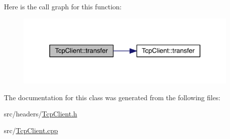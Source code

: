 Here is the call graph for this function\+:\nopagebreak
\begin{figure}[H]
\begin{center}
\leavevmode
\includegraphics[width=309pt]{class_tcp_client_ac893e0e784ed793d6d86447a8d63a193_cgraph}
\end{center}
\end{figure}




The documentation for this class was generated from the following files\+:\begin{DoxyCompactItemize}
\item 
src/headers/\hyperlink{_tcp_client_8h}{Tcp\+Client.\+h}\item 
src/\hyperlink{_tcp_client_8cpp}{Tcp\+Client.\+cpp}\end{DoxyCompactItemize}
